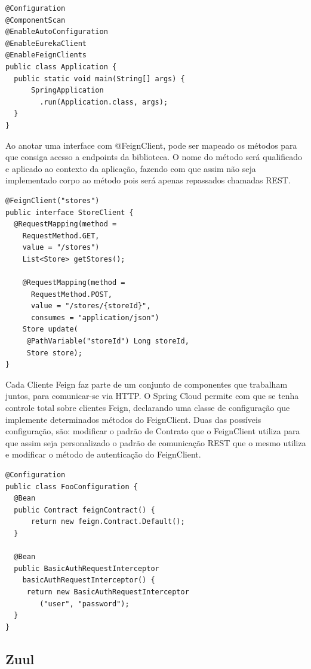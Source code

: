 \documentclass[journal]{IEEEtran}
\begin{document}
\begin{verbatim}
@Configuration
@ComponentScan
@EnableAutoConfiguration
@EnableEurekaClient
@EnableFeignClients
public class Application {
  public static void main(String[] args) {
      SpringApplication
        .run(Application.class, args);
  }
}
\end{verbatim}

Ao anotar uma interface com @FeignClient, pode ser mapeado os métodos para que consiga acesso a endpoints da biblioteca. O nome do método será qualificado e aplicado ao contexto da aplicação, fazendo com que assim não seja implementado corpo ao método pois será apenas repassados chamadas REST.

\begin{verbatim}
@FeignClient("stores")
public interface StoreClient {
  @RequestMapping(method = 
    RequestMethod.GET, 
    value = "/stores")
    List<Store> getStores();

    @RequestMapping(method = 
      RequestMethod.POST, 
      value = "/stores/{storeId}", 
      consumes = "application/json")
    Store update(
     @PathVariable("storeId") Long storeId, 
     Store store);
}
\end{verbatim}

Cada Cliente Feign faz parte de um conjunto de componentes que trabalham juntos, para comunicar-se via HTTP. O Spring Cloud permite com que se tenha controle total sobre clientes Feign, declarando uma classe de configuração que implemente determinados métodos do FeignClient. Duas das possíveis configuração, são: modificar o padrão de Contrato que o FeignClient utiliza para que assim seja personalizado o padrão de comunicação REST que o mesmo utiliza e modificar o método de autenticação do FeignClient.

\begin{verbatim}
@Configuration
public class FooConfiguration {
  @Bean
  public Contract feignContract() {
      return new feign.Contract.Default();
  }

  @Bean
  public BasicAuthRequestInterceptor 
    basicAuthRequestInterceptor() {
     return new BasicAuthRequestInterceptor
        ("user", "password");
  }
}
\end{verbatim}

\subsection{Zuul}
\end{document}
